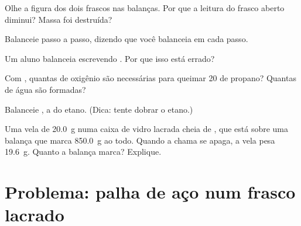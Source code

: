 \begin{exercise}[$\star\star$]\label{exo:g8:balanced-equations:7}
Olhe a figura dos dois frascos nas balanças. Por que a leitura do frasco
aberto diminui? Massa foi destruída?
\end{exercise}

\begin{exercise}[$\star\star$]\label{exo:g8:balanced-equations:8}
Balanceie  passo a passo, dizendo que  %
você balanceia em cada passo.
\end{exercise}

\begin{exercise}[$\star\star$]\label{exo:g8:balanced-equations:9}
Um aluno balanceia  escrevendo . %
Por que isso está errado?
\end{exercise}

\begin{exercise}[$\star\star$]\label{exo:g8:balanced-equations:10}
Com , quantas  de oxigênio são
necessárias para queimar 20  de propano? Quantas  de
água são formadas?
\end{exercise}

\begin{exercise}[$\star\star\star$]\label{exo:g8:balanced-equations:11}
Balanceie , a  do etano. (Dica: tente %
dobrar o etano.)
\end{exercise}

\begin{exercise}[$\star\star\star$]\label{exo:g8:balanced-equations:12}
Uma vela de \qty{20.0}{g}  numa caixa de vidro lacrada cheia de
, que está sobre uma balança que marca \qty{850.0}{g} ao todo. Quando a
chama se apaga, a vela pesa \qty{19.6}{g}. Quanto a balança marca?
Explique.
\end{exercise}

\section{Problema: palha de aço num frasco lacrado}

